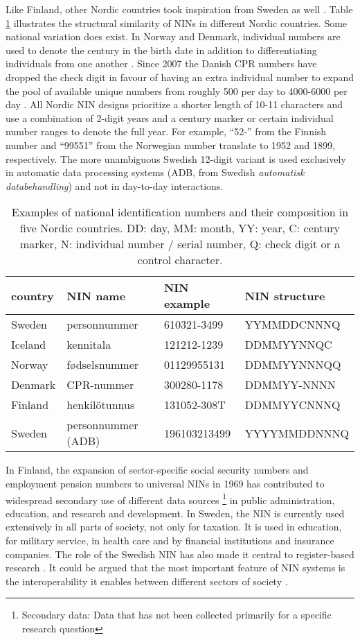 Like Finland, other Nordic countries took inspiration from Sweden as well \citep{Krogness2011}. Table \ref{tab:nin-table2} illustrates the structural similarity of NINs in different Nordic countries. Some national variation does exist. In Norway and Denmark, individual numbers are used to denote the century in the birth date in addition to differentiating individuals from one another \citep{furseth2015, cpr2008}. Since 2007 the Danish CPR numbers have dropped the check digit in favour of having an extra individual number to expand the pool of available unique numbers from roughly 500 per day to 4000-6000 per day \citep{cpr2008, jerlach2009}. All Nordic NIN designs prioritize a shorter length of 10-11 characters and use a combination of 2-digit years and a century marker or certain individual number ranges to denote the full year. For example, ``52-'' from the Finnish number and ``99551'' from the Norwegian number translate to 1952 and 1899, respectively. The more unambiguous Swedish 12-digit variant is used exclusively in automatic data processing systems (ADB, from Swedish \emph{automatisk databehandling}) and not in day-to-day interactions.

\begin{table}[!h]
\centering
\caption{\label{tab:nin-table2}Examples of national identification numbers and their composition in five Nordic countries. DD: day, MM: month, YY: year, C: century marker, N: individual number / serial number, Q: check digit or a control character.}
\centering
\begin{tabular}[t]{llll}
\toprule
country & NIN name & NIN example & NIN structure\\
\midrule
Sweden & personnummer & 610321-3499 & YYMMDDCNNNQ\\
Iceland & kennitala & 121212-1239 & DDMMYYNNQC\\
Norway & fødselsnummer & 01129955131 & DDMMYYNNNQQ\\
Denmark & CPR-nummer & 300280-1178 & DDMMYY-NNNN\\
Finland & henkilötunnus & 131052-308T & DDMMYYCNNNQ\\
\addlinespace
Sweden & personnummer (ADB) & 196103213499 & YYYYMMDDNNNQ\\
\bottomrule
\end{tabular}
\end{table}

In Finland, the expansion of sector-specific social security numbers and employment pension numbers to universal NINs in 1969 has contributed to widespread secondary use of different data sources \footnote{Secondary data: Data that has not been collected primarily for a specific research question} in public administration, education, and research and development. In Sweden, the NIN is currently used extensively in all parts of society, not only for taxation. It is used in education, for military service, in health care and by financial institutions and insurance companies. The role of the Swedish NIN has also made it central to register-based research \citep{scb2016}. It could be argued that the most important feature of NIN systems is the interoperability it enables between different sectors of society \citep{alastalo2022}.

